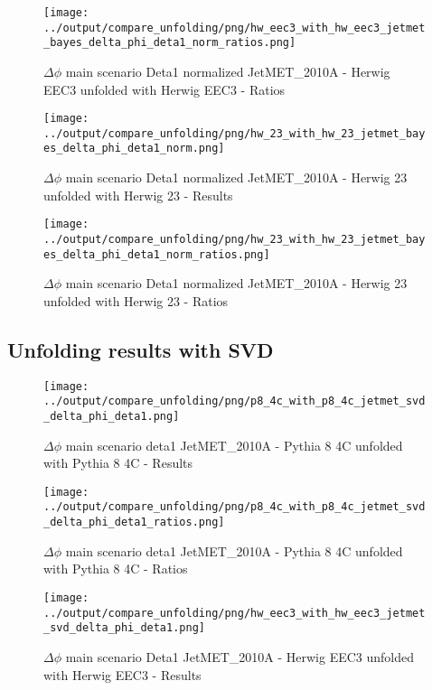 \documentclass[11pt]{book}
\begin{document}
\begin{figure}[ht]
\centering
\texttt{[image: ../output/compare\_unfolding/png/hw\_eec3\_with\_hw\_eec3\_jetmet\_bayes\_delta\_phi\_deta1\_norm\_ratios.png]}
\caption{$\Delta\phi$ main scenario Deta1 normalized JetMET\_2010A - Herwig EEC3 unfolded with Herwig EEC3 - Ratios}
\label{hw_eec3_hw_eec3_jetmet_bayes_delta_phi_deta1_norm_b}
\end{figure}

\begin{figure}[ht]
\centering
\texttt{[image: ../output/compare\_unfolding/png/hw\_23\_with\_hw\_23\_jetmet\_bayes\_delta\_phi\_deta1\_norm.png]}
\caption{$\Delta\phi$ main scenario Deta1 normalized JetMET\_2010A - Herwig 23 unfolded with Herwig 23 - Results}
\label{hw_23_hw_23_jetmet_bayes_delta_phi_deta1_norm_a}
\end{figure}

\begin{figure}[ht]
\centering
\texttt{[image: ../output/compare\_unfolding/png/hw\_23\_with\_hw\_23\_jetmet\_bayes\_delta\_phi\_deta1\_norm\_ratios.png]}
\caption{$\Delta\phi$ main scenario Deta1 normalized JetMET\_2010A - Herwig 23 unfolded with Herwig 23 - Ratios}
\label{hw_23_hw_23_jetmet_bayes_delta_phi_deta1_norm_b}
\end{figure}

\clearpage
\subsection{Unfolding results with SVD}

\begin{figure}[ht]
\centering
\texttt{[image: ../output/compare\_unfolding/png/p8\_4c\_with\_p8\_4c\_jetmet\_svd\_delta\_phi\_deta1.png]}
\caption{$\Delta\phi$ main scenario deta1 JetMET\_2010A - Pythia 8 4C unfolded with Pythia 8 4C - Results}
\label{p8_p8_jetmet_svd_delta_phi_deta1_a}
\end{figure}

\begin{figure}[ht]
\centering
\texttt{[image: ../output/compare\_unfolding/png/p8\_4c\_with\_p8\_4c\_jetmet\_svd\_delta\_phi\_deta1\_ratios.png]}
\caption{$\Delta\phi$ main scenario deta1 JetMET\_2010A - Pythia 8 4C unfolded with Pythia 8 4C - Ratios}
\label{p8_p8_jetmet_svd_delta_phi_deta1_b}
\end{figure}

\begin{figure}[ht]
\centering
\texttt{[image: ../output/compare\_unfolding/png/hw\_eec3\_with\_hw\_eec3\_jetmet\_svd\_delta\_phi\_deta1.png]}
\caption{$\Delta\phi$ main scenario Deta1 JetMET\_2010A - Herwig EEC3 unfolded with Herwig EEC3 - Results}
\label{hw_eec3_hw_eec3_jetmet_svd_delta_phi_deta1_a}
\end{figure}
\end{document}
